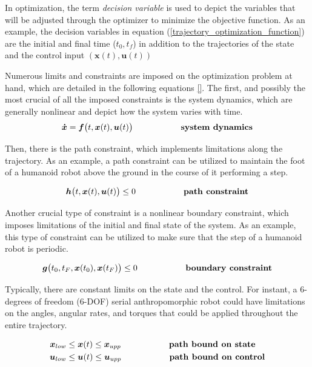 \documentclass{thesisreport}
\begin{document}
\noindent In optimization, the term \textit{decision variable} is used to depict the variables that will be adjusted through the optimizer to minimize the objective function. As an example, the decision variables in equation (\ref{trajectory_optimization_function}) are the initial and final time ($t_0, t_f$) in addition to the trajectories of the state and the control input $(\bm{x}(t),\bm{u}(t))$

Numerous limits and constraints are imposed on the optimization problem at hand, which are detailed in the following equations \ref{}. The first, and possibly the most crucial of all the imposed constraints is the system dynamics, which are generally nonlinear and depict how the system varies with time.
\begin{equation}
	\bm{\dot{x}} = \bm{f}\big(t,\bm{x}(t),\bm{u}(t)\big) \space{\hspace{2cm} \textbf{system dynamics}}
\end{equation}
 

\newpage 
 
\noindent Then, there is the path constraint, which implements limitations along the trajectory. As an example, a path constraint can be utilized to maintain the foot of a humanoid robot above the ground in the course of it performing a step.
 
 
\begin{equation}
	\bm{h}\big(t,\bm{x}(t),\bm{u}(t)\big) \leq 0 \space{\hspace{2cm} \textbf{path constraint}}
\end{equation}
 
 
\noindent Another crucial type of constraint is a nonlinear boundary constraint, which imposes limitations of the initial and final state of the system. As an example, this type of constraint can be utilized to make sure that the step of a humanoid robot is periodic.
 
\begin{equation}
	\bm{g}\big(t_0,t_F,\bm{x}(t_0),\bm{x}(t_F)\big) \leq 0 \space{\hspace{2cm} \textbf{boundary constraint}}
\end{equation}
 
 Typically, there are constant limits on the state and the control. For instant, a 6-degrees of freedom (6-DOF) serial anthropomorphic robot  could have limitations on the angles, angular rates, and torques that could be applied throughout the entire trajectory. 
 
 \begin{align}
 \bm{x}_{low} &\leq \bm{x}(t) \leq \bm{x}_{upp} \space{\hspace{2cm} \textbf{path bound on state}} \\
 \bm{u}_{low} &\leq \bm{u}(t) \leq \bm{u}_{upp} \space{\hspace{2cm} \textbf{path bound on control}} 
 \end{align}
\end{document}
